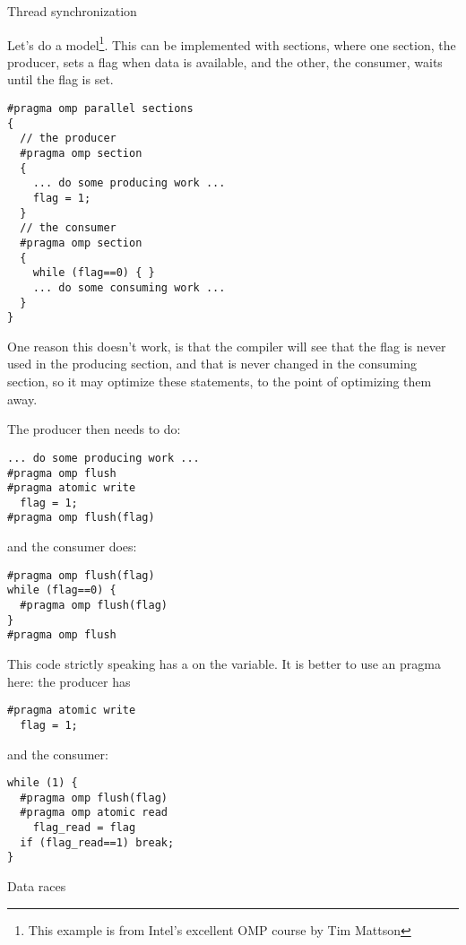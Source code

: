 
 {Thread synchronization}

Let's do a  model\footnote{This example
  is from Intel's excellent OMP course by Tim Mattson}.  This can be
implemented with sections, where one section, the producer, sets a
flag when data is available, and the other, the consumer, waits until
the flag is set.
\begin{lstlisting}
#pragma omp parallel sections
{
  // the producer
  #pragma omp section
  {
    ... do some producing work ...
    flag = 1;
  }
  // the consumer
  #pragma omp section
  {
    while (flag==0) { }
    ... do some consuming work ...
  }
}
\end{lstlisting}
One reason this doesn't work, is that the compiler will see that the flag is never used
in the producing section, and that is never changed in the consuming section, so
it may optimize these statements, to the point of optimizing them away.

The producer then needs to do:
\begin{lstlisting}
... do some producing work ...
#pragma omp flush
#pragma atomic write
  flag = 1;
#pragma omp flush(flag)
\end{lstlisting}
and the consumer does:
\begin{lstlisting}
#pragma omp flush(flag)
while (flag==0) {
  #pragma omp flush(flag)
}
#pragma omp flush
\end{lstlisting}
This code strictly speaking has a  on the  variable.
It is better to use an  pragma here: the producer has
\begin{lstlisting}
#pragma atomic write
  flag = 1;
\end{lstlisting}
and the consumer:
\begin{lstlisting}
while (1) {
  #pragma omp flush(flag)
  #pragma omp atomic read
    flag_read = flag
  if (flag_read==1) break;
}
\end{lstlisting}

 {Data races}

